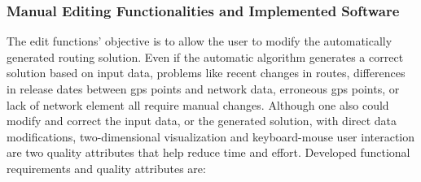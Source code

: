 \subsubsection{Manual Editing Functionalities and Implemented Software}
The edit functions' objective is to allow the user to modify the automatically generated routing solution. Even if the automatic algorithm generates a correct solution based on input data, problems like recent changes in routes, differences in release dates between \gls{gps} points and network data, erroneous \gls{gps} points, or lack of network element all require manual changes. Although one also could modify and correct the input data, or the generated solution, with direct data modifications, two-dimensional visualization and keyboard-mouse user interaction are two quality attributes that help reduce time and effort. Developed functional requirements and quality attributes are:
%
